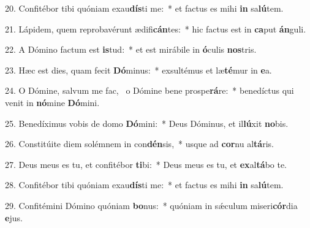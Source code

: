 20. Confitébor tibi quóniam exau\textbf{dís}ti me:~*  et factus es mihi \textbf{in} sa\textbf{lú}tem.\

21. Lápidem, quem reprobavérunt ædifi\textbf{cán}tes:~*  hic factus est in \textbf{ca}put \textbf{án}guli.\

22. A Dómino factum est \textbf{is}tud:~*  et est mirábile in \textbf{ó}culis \textbf{nos}tris.\

23. Hæc est dies, quam fecit \textbf{Dó}minus:~*  exsultémus et læ\textbf{té}mur in \textbf{e}a.\

24. O Dómine, salvum me fac, \dag\  o Dómine bene prospe\textbf{rá}re:~*  benedíctus qui venit in \textbf{nó}mine \textbf{Dó}mini.\

25. Benedíximus vobis de domo \textbf{Dó}mini:~*  Deus Dóminus, et il\textbf{lú}xit \textbf{no}bis.\

26. Constitúite diem solémnem in con\textbf{dén}sis,~*  usque ad \textbf{cor}nu al\textbf{tá}ris.\

27. Deus meus es tu, et confitébor \textbf{ti}bi:~*  Deus meus es tu, et \textbf{ex}al\textbf{tá}bo te.\

28. Confitébor tibi quóniam exau\textbf{dís}ti me:~*  et factus es mihi \textbf{in} sa\textbf{lú}tem.\

29. Confitémini Dómino quóniam \textbf{bo}nus:~*  quóniam in sǽculum miseri\textbf{cór}dia \textbf{e}jus.\


